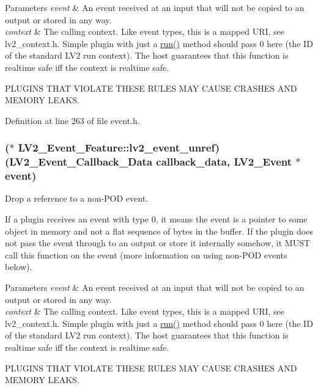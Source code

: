 \begin{DoxyParams}{Parameters}
{\em event} & An event received at an input that will not be copied to an output or stored in any way.\\
\hline
{\em context} & The calling context. Like event types, this is a mapped U\+RI, see lv2\+\_\+context.\+h. Simple plugin with just a \hyperlink{namespacewaflib_1_1_task_a859c6336afe027ae782f84b9e49a4f0f}{run()} method should pass 0 here (the ID of the \textquotesingle{}standard\textquotesingle{} L\+V2 run context). The host guarantees that this function is realtime safe iff the context is realtime safe.\\
\hline
\end{DoxyParams}
P\+L\+U\+G\+I\+NS T\+H\+AT V\+I\+O\+L\+A\+TE T\+H\+E\+SE R\+U\+L\+ES M\+AY C\+A\+U\+SE C\+R\+A\+S\+H\+ES A\+ND M\+E\+M\+O\+RY L\+E\+A\+KS. 

Definition at line 263 of file event.\+h.

\subsubsection[{\texorpdfstring{lv2\+\_\+event\+\_\+unref}{lv2_event_unref}}]{($\ast$ L\+V2\+\_\+\+Event\+\_\+\+Feature\+::lv2\+\_\+event\+\_\+unref) ({\bf L\+V2\+\_\+\+Event\+\_\+\+Callback\+\_\+\+Data} {\bf callback\+\_\+data}, {\bf L\+V2\+\_\+\+Event} $\ast$event)}\hypertarget{struct_l_v2___event___feature_a91a3e8d1e71ae094e63863ad885dc10d}{}\label{struct_l_v2___event___feature_a91a3e8d1e71ae094e63863ad885dc10d}
Drop a reference to a non-\/\+P\+OD event.

If a plugin receives an event with type 0, it means the event is a pointer to some object in memory and not a flat sequence of bytes in the buffer. If the plugin does not pass the event through to an output or store it internally somehow, it M\+U\+ST call this function on the event (more information on using non-\/\+P\+OD events below).


\begin{DoxyParams}{Parameters}
{\em event} & An event received at an input that will not be copied to an output or stored in any way.\\
\hline
{\em context} & The calling context. Like event types, this is a mapped U\+RI, see lv2\+\_\+context.\+h. Simple plugin with just a \hyperlink{namespacewaflib_1_1_task_a859c6336afe027ae782f84b9e49a4f0f}{run()} method should pass 0 here (the ID of the \textquotesingle{}standard\textquotesingle{} L\+V2 run context). The host guarantees that this function is realtime safe iff the context is realtime safe.\\
\hline
\end{DoxyParams}
P\+L\+U\+G\+I\+NS T\+H\+AT V\+I\+O\+L\+A\+TE T\+H\+E\+SE R\+U\+L\+ES M\+AY C\+A\+U\+SE C\+R\+A\+S\+H\+ES A\+ND M\+E\+M\+O\+RY L\+E\+A\+KS. 


